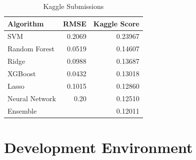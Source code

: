 \documentclass[sigconf]{acmart}
\begin{document}
	\begin{table}[H]
		\caption{Kaggle Submissions}
		\label{tab:kaggle}		
		\begin{tabular}{lrr}
			\toprule
			Algorithm & RMSE & Kaggle Score \\
			\midrule
			SVM &  0.2069 & 0.23967 \\
			Random Forest &  0.0519 & 0.14607 \\
			Ridge &  0.0988 & 0.13687 \\
			XGBoost &  0.0432 & 0.13018 \\					
			Lasso &  0.1015 & 0.12860 \\
			Neural Network &  0.20 & 0.12510 \\
			Ensemble &   & 0.12011 \\
			\bottomrule
		\end{tabular}
	\end{table}
	
	\section{Development Environment}
	
\end{document}
